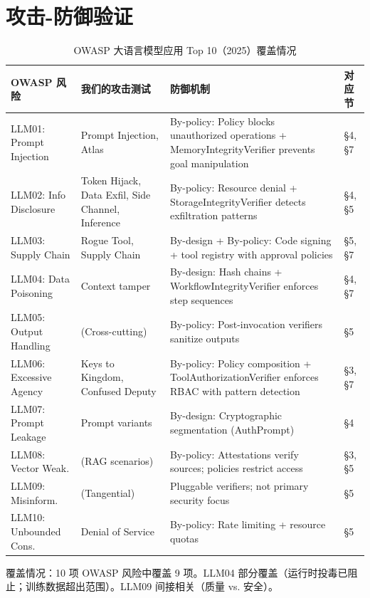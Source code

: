 \section{攻击-防御验证}
\label{sec:attack-defense}

\begin{table}[t]
\centering
\caption{OWASP 大语言模型应用 Top 10（2025）覆盖情况}
\label{tab:owasp-coverage}
\scriptsize
\begin{tabular}{|p{3cm}|p{4cm}|p{6.5cm}|p{1.5cm}|}
\hline
\textbf{OWASP 风险} & \textbf{我们的攻击测试} & \textbf{防御机制} & \textbf{对应节} \\
\hline
LLM01: Prompt Injection & Prompt Injection, Atlas & By-policy: Policy blocks unauthorized operations + MemoryIntegrityVerifier prevents goal manipulation & §4, §7 \\
\hline
LLM02: Info Disclosure & Token Hijack, Data Exfil, Side Channel, Inference & By-policy: Resource denial + StorageIntegrityVerifier detects exfiltration patterns & §4, §5 \\
\hline
LLM03: Supply Chain & Rogue Tool, Supply Chain & By-design + By-policy: Code signing + tool registry with approval policies & §5, §7 \\
\hline
LLM04: Data Poisoning & Context tamper & By-design: Hash chains + WorkflowIntegrityVerifier enforces step sequences & §4, §7 \\
\hline
LLM05: Output Handling & (Cross-cutting) & By-policy: Post-invocation verifiers sanitize outputs & §5 \\
\hline
LLM06: Excessive Agency & Keys to Kingdom, Confused Deputy & By-policy: Policy composition + ToolAuthorizationVerifier enforces RBAC with pattern detection & §3, §7 \\
\hline
LLM07: Prompt Leakage & Prompt variants & By-design: Cryptographic segmentation (AuthPrompt) & §4 \\
\hline
LLM08: Vector Weak. & (RAG scenarios) & By-policy: Attestations verify sources; policies restrict access & §3, §5 \\
\hline
LLM09: Misinform. & (Tangential) & Pluggable verifiers; not primary security focus & §5 \\
\hline
LLM10: Unbounded Cons. & Denial of Service & By-policy: Rate limiting + resource quotas & §5 \\
\hline
\end{tabular}

\raggedright
\scriptsize{覆盖情况：10 项 OWASP 风险中覆盖 9 项。LLM04 部分覆盖（运行时投毒已阻止；训练数据超出范围）。LLM09 间接相关（质量 vs. 安全）。}
\end{table}

